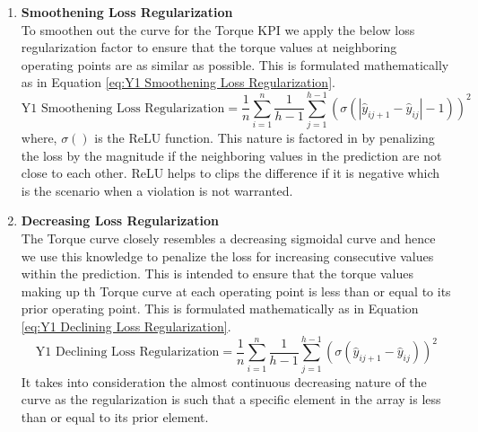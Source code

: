\documentclass{report} %
\begin{document}
\begin{enumerate}
\item \textbf{Smoothening Loss Regularization} \\
To smoothen out the curve for the Torque \ac{KPI} we apply the below loss regularization factor to ensure that the torque values at neighboring operating points are 
as similar as possible. This is formulated mathematically as in Equation \ref{eq:Y1 Smoothening Loss Regularization}.
\begin{equation}
\text{Y1 Smoothening Loss Regularization} = \frac{1}{n} \sum_{i=1}^{n}\frac{1}{h-1} \sum_{j=1}^{h-1} \left(\sigma(|\hat{y}_{i{j+1}} - \hat{y}_{ij}| - 1)\right)^2 
\label{eq:Y1 Smoothening Loss Regularization}
\end{equation} 
where, $\sigma()$ is the \ac{ReLU} function.
This nature is factored in by penalizing the loss by the magnitude if the neighboring values in the prediction are not close to each other.
\ac{ReLU} helps to clips the difference if it is negative which is the scenario when a violation is not warranted.
\item \textbf{Decreasing Loss Regularization} \\
The Torque curve closely resembles a decreasing sigmoidal curve and hence we use this knowledge to penalize the loss for increasing consecutive values within the prediction. 
This is intended to ensure that the torque values making up th Torque curve at each operating point is less than or equal to its prior operating point.
This is formulated mathematically as in Equation \ref{eq:Y1 Declining Loss Regularization}.
\begin{equation}
    \text{Y1 Declining Loss Regularization} = \frac{1}{n} \sum_{i=1}^{n}\frac{1}{h-1} \sum_{j=1}^{h-1} \left(\sigma(\hat{y}_{i{j+1}} - \hat{y}_{ij})\right)^2
    \label{eq:Y1 Declining Loss Regularization}
\end{equation} 
It takes into consideration the almost continuous decreasing nature of the curve as the regularization is such that a specific element in the array is less than or 
equal to its prior element.
\end{enumerate}
\end{document}
